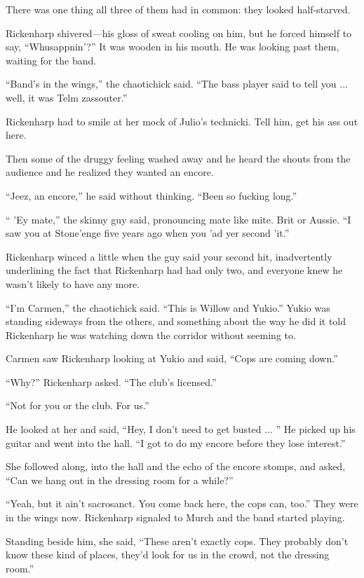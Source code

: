 There was one thing all three of them had in common: they looked half-starved.

Rickenharp shivered—his gloss of sweat cooling on him, but he forced himself to say, ``Whusappnin'?'' It was wooden in his mouth. He was looking past them, waiting for the band.

``Band's in the wings,'' the chaotichick said. ``The bass player said to tell you ... well, it was Telm zassouter.''

Rickenharp had to smile at her mock of Julio's technicki. Tell him, get his ass out here.

Then some of the druggy feeling washed away and he heard the shouts from the audience and he realized they wanted an encore.

``Jeez, an encore,'' he said without thinking. ``Been so fucking long.''

`` 'Ey mate,'' the skinny guy said, pronouncing mate like mite. Brit or Aussie. ``I saw you at Stone'enge five years ago when you 'ad yer second 'it.''

Rickenharp winced a little when the guy said your second hit, inadvertently underlining the fact that Rickenharp had had only two, and everyone knew he wasn't likely to have any more.

``I'm Carmen,'' the chaotichick said. ``This is Willow and Yukio.'' Yukio was standing sideways from the others, and something about the way he did it told Rickenharp he was watching down the corridor without seeming to.

Carmen saw Rickenharp looking at Yukio and said, ``Cops are coming down.''

``Why?'' Rickenharp asked. ``The club's licensed.''

``Not for you or the club. For us.''

He looked at her and said, ``Hey, I don't need to get busted ... '' He picked up his guitar and went into the hall. ``I got to do my encore before they lose interest.''

She followed along, into the hall and the echo of the encore stomps, and asked, ``Can we hang out in the dressing room for a while?''

``Yeah, but it ain't sacrosanct. You come back here, the cops can, too.'' They were in the wings now. Rickenharp signaled to Murch and the band started playing.

Standing beside him, she said, ``These aren't exactly cops. They probably don't know these kind of places, they'd look for us in the crowd, not the dressing room.''

